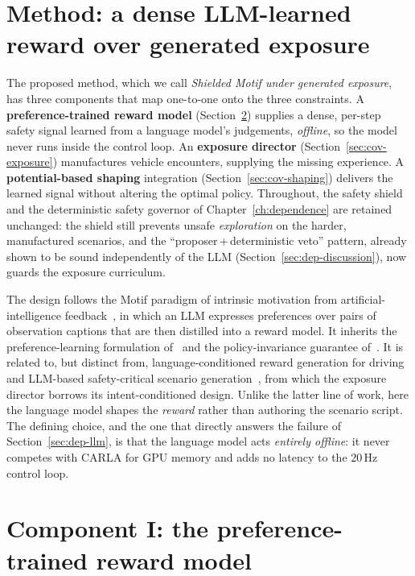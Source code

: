 \section{Method: a dense LLM-learned reward over generated exposure}\label{sec:cov-method}

The proposed method, which we call \emph{Shielded Motif under generated exposure}, has three
components that map one-to-one onto the three constraints. A \textbf{preference-trained reward
model} (Section~\ref{sec:cov-reward}) supplies a dense, per-step safety signal learned from a
language model's judgements, \emph{offline}, so the model never runs inside the control loop.
An \textbf{exposure director} (Section~\ref{sec:cov-exposure}) manufactures vehicle encounters,
supplying the missing experience. A \textbf{potential-based shaping} integration
(Section~\ref{sec:cov-shaping}) delivers the learned signal without altering the optimal policy.
Throughout, the safety shield and the deterministic safety governor of
Chapter~\ref{ch:dependence} are retained unchanged: the shield still prevents unsafe
\emph{exploration} on the harder, manufactured scenarios, and the ``proposer\,+\,deterministic
veto'' pattern, already shown to be sound independently of the LLM
(Section~\ref{sec:dep-discussion}), now guards the exposure curriculum.

The design follows the Motif paradigm of intrinsic motivation from artificial-intelligence
feedback~\cite{klissarov2023motif}, in which an LLM expresses preferences over pairs of
observation captions that are then distilled into a reward model. It inherits the
preference-learning formulation of~\cite{christiano2017preferences} and the policy-invariance
guarantee of~\cite{ng1999shaping}. It is related to, but distinct from, language-conditioned
reward generation for driving~\cite{huang2025vlmrl} and LLM-based safety-critical scenario
generation~\cite{zhang2024chatscene}, from which the exposure director borrows its
intent-conditioned design. Unlike the latter line of work, here the language model shapes the
\emph{reward} rather than authoring the scenario script. The defining choice, and the one that
directly answers the failure of Section~\ref{sec:dep-llm}, is that the language model acts
\emph{entirely offline}: it never competes with CARLA for GPU memory and adds no latency to the
\(20\,\mathrm{Hz}\) control loop.

\section{Component I: the preference-trained reward model}\label{sec:cov-reward}

